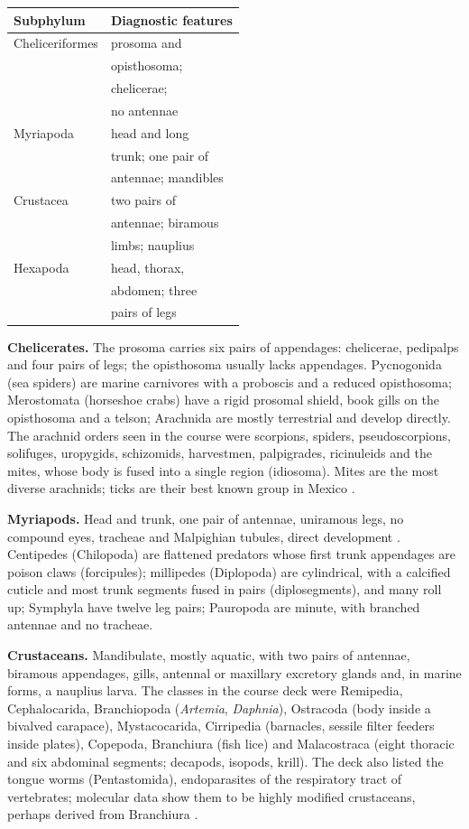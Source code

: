 \begin{center}
\begin{tabular}{ll}
Subphylum & Diagnostic features \\
\hline
Cheliceriformes & prosoma and \\
& opisthosoma; \\
& chelicerae; \\
& no antennae \\
Myriapoda & head and long \\
& trunk; one pair of \\
& antennae; mandibles \\
Crustacea & two pairs of \\
& antennae; biramous \\
& limbs; nauplius \\
Hexapoda & head, thorax, \\
& abdomen; three \\
& pairs of legs \\
\end{tabular}
\end{center}

\textbf{Chelicerates.} The prosoma carries
six pairs of appendages: chelicerae,
pedipalps and four pairs of legs; the
opisthosoma usually lacks appendages.
Pycnogonida (sea spiders) are marine
carnivores with a proboscis and a reduced
opisthosoma; Merostomata (horseshoe crabs)
have a rigid prosomal shield, book gills on
the opisthosoma and a telson; Arachnida are
mostly terrestrial and develop directly. The
arachnid orders seen in the course were
scorpions, spiders, pseudoscorpions,
solifuges, uropygids, schizomids, harvestmen,
palpigrades, ricinuleids and the mites, whose
body is fused into a single region
(idiosoma). Mites are the most diverse
arachnids; ticks are their best known group
in Mexico \cite{perez2014acari}.

\textbf{Myriapods.} Head and trunk, one pair
of antennae, uniramous legs, no compound
eyes, tracheae and Malpighian tubules, direct
development \cite[Chapter
18]{brusca2003invertebrates}. Centipedes
(Chilopoda) are flattened predators whose
first trunk appendages are poison claws
(forcipules); millipedes (Diplopoda) are
cylindrical, with a calcified cuticle and
most trunk segments fused in pairs
(diplosegments), and many roll up; Symphyla
have twelve leg pairs; Pauropoda are minute,
with branched antennae and no tracheae.

\textbf{Crustaceans.} Mandibulate, mostly
aquatic, with two pairs of antennae, biramous
appendages, gills, antennal or maxillary
excretory glands and, in marine forms, a
nauplius larva. The classes in the course
deck were Remipedia, Cephalocarida,
Branchiopoda (\emph{Artemia},
\emph{Daphnia}), Ostracoda (body inside a
bivalved carapace), Mystacocarida, Cirripedia
(barnacles, sessile filter feeders inside
plates), Copepoda, Branchiura (fish lice) and
Malacostraca (eight thoracic and six
abdominal segments; decapods, isopods,
krill). The deck also listed the tongue worms
(Pentastomida), endoparasites of the
respiratory tract of vertebrates; molecular
data show them to be highly modified
crustaceans, perhaps derived from Branchiura
\cite[Chapter 16]{brusca2003invertebrates}.


